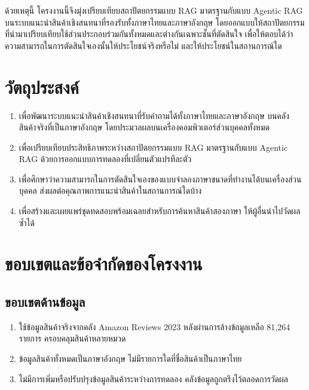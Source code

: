 ด้วยเหตุนี้ โครงงานนี้จึงมุ่งเปรียบเทียบสถาปัตยกรรมแบบ RAG มาตรฐานกับแบบ Agentic RAG บนระบบแนะนำสินค้าเชิงสนทนาที่รองรับทั้งภาษาไทยและภาษาอังกฤษ โดยออกแบบให้สถาปัตยกรรมที่นำมาเปรียบเทียบใช้ส่วนประกอบร่วมกันทั้งหมดและต่างกันเฉพาะชั้นที่ตัดสินใจ เพื่อให้ตอบได้ว่าความสามารถในการตัดสินใจเองนั้นให้ประโยชน์จริงหรือไม่ และให้ประโยชน์ในสถานการณ์ใด

\section{วัตถุประสงค์}

\begin{enumerate}[label=\arabic*)]
    \item เพื่อพัฒนาระบบแนะนำสินค้าเชิงสนทนาที่รับคำถามได้ทั้งภาษาไทยและภาษาอังกฤษ บนคลังสินค้าจริงที่เป็นภาษาอังกฤษ โดยประมวลผลบนเครื่องคอมพิวเตอร์ส่วนบุคคลทั้งหมด
    \item เพื่อเปรียบเทียบประสิทธิภาพระหว่างสถาปัตยกรรมแบบ RAG มาตรฐานกับแบบ Agentic RAG ด้วยการออกแบบการทดลองที่เปลี่ยนตัวแปรทีละตัว
    \item เพื่อศึกษาว่าความสามารถในการตัดสินใจเองของแบบจำลองภาษาขนาดที่ทำงานได้บนเครื่องส่วนบุคคล ส่งผลต่อคุณภาพการแนะนำสินค้าในสถานการณ์ใดบ้าง
    \item เพื่อสร้างและเผยแพร่ชุดทดสอบพร้อมเฉลยสำหรับการค้นหาสินค้าสองภาษา ให้ผู้อื่นนำไปวัดผลซ้ำได้
\end{enumerate}

\section{ขอบเขตและข้อจำกัดของโครงงาน}

\subsection{ขอบเขตด้านข้อมูล}

\begin{enumerate}[label=\arabic*)]
    \item ใช้ข้อมูลสินค้าจริงจากคลัง Amazon Reviews 2023 \cite{hou2024amazon} หลังผ่านการล้างข้อมูลเหลือ 81{,}264 รายการ ครอบคลุมสินค้าหลายหมวด
    \item ข้อมูลสินค้าทั้งหมดเป็นภาษาอังกฤษ ไม่มีรายการใดที่ชื่อสินค้าเป็นภาษาไทย
    \item ไม่มีการเพิ่มหรือปรับปรุงข้อมูลสินค้าระหว่างการทดลอง คลังข้อมูลถูกตรึงไว้ตลอดการวัดผล
\end{enumerate}

